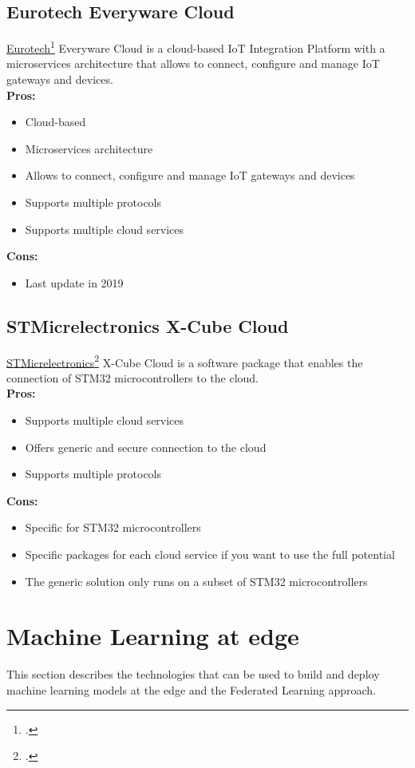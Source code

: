 \subsection{Eurotech Everyware Cloud}
\label{everyware-cloud}
\href{https://www.eurotech.com/}{Eurotech}\footcite{site:eurotech} Everyware Cloud is a cloud-based IoT Integration Platform with a microservices architecture that allows to connect, configure and manage IoT gateways and devices.\\
\textbf{Pros:}
\begin{itemize}
    \item Cloud-based
    \item Microservices architecture
    \item Allows to connect, configure and manage IoT gateways and devices
    \item Supports multiple protocols
    \item Supports multiple cloud services
\end{itemize}
\textbf{Cons:}
\begin{itemize}
    \item Last update in 2019
\end{itemize}


\subsection{STMicrelectronics X-Cube Cloud}
\label{stm}
\href{https://www.st.com/}{STMicrelectronics}\footcite{site:st-micro} X-Cube Cloud is a software package that enables the connection of STM32 microcontrollers to the cloud.\\
\textbf{Pros:}
\begin{itemize}
    \item Supports multiple cloud services
    \item Offers generic and secure connection to the cloud
    \item Supports multiple protocols
\end{itemize}
\textbf{Cons:}
\begin{itemize}
    \item Specific for STM32 microcontrollers
    \item Specific packages for each cloud service if you want to use the full potential
    \item The generic solution only runs on a subset of STM32 microcontrollers
\end{itemize}


\section{Machine Learning at edge} 
This section describes the technologies that can be used to build and deploy machine learning models at the edge and the Federated Learning approach.

